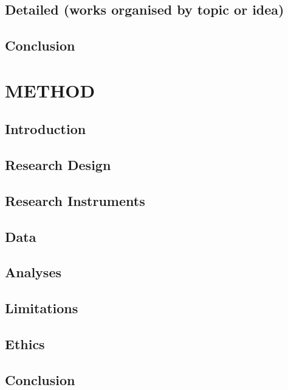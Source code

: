 \documentclass[]{book}
\theoremstyle{definition}
\theoremstyle{definition}
\theoremstyle{definition}
\theoremstyle{remark}
\begin{document}
\section{Detailed (works organised by topic or
idea)}\label{detailed-works-organised-by-topic-or-idea}

\section{Conclusion}\label{conclusion}

\chapter{METHOD}\label{method}

\section{Introduction}\label{introduction-2}

\section{Research Design}\label{research-design}

\section{Research Instruments}\label{research-instruments}

\section{Data}\label{data}

\section{Analyses}\label{analyses}

\section{Limitations}\label{limitations}

\section{Ethics}\label{ethics}

\section{Conclusion}\label{conclusion-1}
\end{document}
